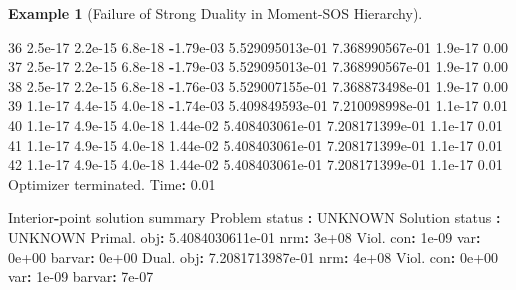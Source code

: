 \documentclass[
]{book}
\newenvironment{Shaded}{\begin{snugshade}}{\end{snugshade}}
\newcommand{\FloatTok}[1]{\textcolor[rgb]{0.00,0.00,0.81}{#1}}
\newcommand{\NormalTok}[1]{#1}
\newcommand{\OperatorTok}[1]{\textcolor[rgb]{0.81,0.36,0.00}{\textbf{#1}}}
\newcommand{\VariableTok}[1]{\textcolor[rgb]{0.00,0.00,0.00}{#1}}
\theoremstyle{definition}
\theoremstyle{definition}
\newtheorem{example}{Example}[chapter]
\theoremstyle{definition}
\theoremstyle{definition}
\theoremstyle{remark}
\begin{document}
\begin{example}[Failure of Strong Duality in Moment-SOS Hierarchy]
\begin{Shaded}
\begin{Highlighting}[]
\FloatTok{36}  \FloatTok{2.5e{-}17}  \FloatTok{2.2e{-}15}  \FloatTok{6.8e{-}18}  \OperatorTok{{-}}\FloatTok{1.79e{-}03}  \FloatTok{5.529095013e{-}01}   \FloatTok{7.368990567e{-}01}   \FloatTok{1.9e{-}17}  \FloatTok{0.00}  
\FloatTok{37}  \FloatTok{2.5e{-}17}  \FloatTok{2.2e{-}15}  \FloatTok{6.8e{-}18}  \OperatorTok{{-}}\FloatTok{1.79e{-}03}  \FloatTok{5.529095013e{-}01}   \FloatTok{7.368990567e{-}01}   \FloatTok{1.9e{-}17}  \FloatTok{0.00}  
\FloatTok{38}  \FloatTok{2.5e{-}17}  \FloatTok{2.2e{-}15}  \FloatTok{6.8e{-}18}  \OperatorTok{{-}}\FloatTok{1.76e{-}03}  \FloatTok{5.529007155e{-}01}   \FloatTok{7.368873498e{-}01}   \FloatTok{1.9e{-}17}  \FloatTok{0.00}  
\FloatTok{39}  \FloatTok{1.1e{-}17}  \FloatTok{4.4e{-}15}  \FloatTok{4.0e{-}18}  \OperatorTok{{-}}\FloatTok{1.74e{-}03}  \FloatTok{5.409849593e{-}01}   \FloatTok{7.210098998e{-}01}   \FloatTok{1.1e{-}17}  \FloatTok{0.01}  
\FloatTok{40}  \FloatTok{1.1e{-}17}  \FloatTok{4.9e{-}15}  \FloatTok{4.0e{-}18}  \FloatTok{1.44e{-}02}   \FloatTok{5.408403061e{-}01}   \FloatTok{7.208171399e{-}01}   \FloatTok{1.1e{-}17}  \FloatTok{0.01}  
\FloatTok{41}  \FloatTok{1.1e{-}17}  \FloatTok{4.9e{-}15}  \FloatTok{4.0e{-}18}  \FloatTok{1.44e{-}02}   \FloatTok{5.408403061e{-}01}   \FloatTok{7.208171399e{-}01}   \FloatTok{1.1e{-}17}  \FloatTok{0.01}  
\FloatTok{42}  \FloatTok{1.1e{-}17}  \FloatTok{4.9e{-}15}  \FloatTok{4.0e{-}18}  \FloatTok{1.44e{-}02}   \FloatTok{5.408403061e{-}01}   \FloatTok{7.208171399e{-}01}   \FloatTok{1.1e{-}17}  \FloatTok{0.01}  
\VariableTok{Optimizer} \VariableTok{terminated}\NormalTok{. }\VariableTok{Time}\OperatorTok{:} \FloatTok{0.01}    


\VariableTok{Interior}\OperatorTok{{-}}\VariableTok{point} \VariableTok{solution} \VariableTok{summary}
  \VariableTok{Problem} \VariableTok{status}  \OperatorTok{:} \VariableTok{UNKNOWN}
  \VariableTok{Solution} \VariableTok{status} \OperatorTok{:} \VariableTok{UNKNOWN}
  \VariableTok{Primal}\NormalTok{.  }\VariableTok{obj}\OperatorTok{:} \FloatTok{5.4084030611e{-}01}    \VariableTok{nrm}\OperatorTok{:} \FloatTok{3e+08}    \VariableTok{Viol}\NormalTok{.  }\VariableTok{con}\OperatorTok{:} \FloatTok{1e{-}09}    \VariableTok{var}\OperatorTok{:} \FloatTok{0e+00}    \VariableTok{barvar}\OperatorTok{:} \FloatTok{0e+00}  
  \VariableTok{Dual}\NormalTok{.    }\VariableTok{obj}\OperatorTok{:} \FloatTok{7.2081713987e{-}01}    \VariableTok{nrm}\OperatorTok{:} \FloatTok{4e+08}    \VariableTok{Viol}\NormalTok{.  }\VariableTok{con}\OperatorTok{:} \FloatTok{0e+00}    \VariableTok{var}\OperatorTok{:} \FloatTok{1e{-}09}    \VariableTok{barvar}\OperatorTok{:} \FloatTok{7e{-}07} 
\end{Highlighting}
\end{Shaded}


\end{example}
\end{document}
